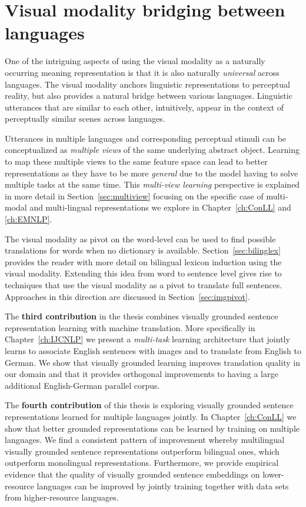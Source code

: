 \section{Visual modality bridging between languages}

One of the intriguing aspects of using the visual modality as a naturally occurring
meaning representation is that it is also naturally \emph{universal} across languages.
The visual modality anchors linguistic representations to perceptual reality, but also
provides a natural bridge between various languages. Linguistic utterances that are similar
to each other, intuitively, appear in the context of perceptually similar scenes across languages.

Utterances in multiple languages and corresponding perceptual stimuli
can be conceptualized as \emph{multiple views} of the same underlying abstract object.
Learning to map these multiple views to the same feature space can lead to better representations as
they have to be more \emph{general} due to the model having to solve multiple tasks at the same time.
This \emph{multi-view learning} perspective is explained in more detail in Section~\ref{sec:multiview}
focusing on the specific case of multi-modal and multi-lingual representations we explore in
Chapter~\ref{ch:ConLL} and \ref{ch:EMNLP}.

The visual modality as pivot on the word-level can be used to find possible translations
for words when no dictionary is available. Section~\ref{sec:bilinglex} provides the reader with more
detail on bilingual lexicon induction using the visual modality.
Extending this idea from word to sentence level gives rise to techniques that
use the visual modality as a pivot to translate full sentences. Approaches in this direction are discussed
in Section~\ref{sec:imgpivot}.

The \textbf{third contribution} in the thesis combines visually grounded sentence representation learning
with machine translation. More specifically in Chapter~\ref{ch:IJCNLP} we present a \emph{multi-task}
learning architecture that jointly learns to associate English sentences with images and to translate from
English to German. We show that visually grounded learning improves translation quality in our domain and that
it provides orthogonal improvements to having a large additional English-German parallel corpus.

The \textbf{fourth contribution} of this thesis is exploring visually grounded 
sentence representations learned for multiple languages jointly.  
In Chapter~\ref{ch:ConLL} we show that better grounded
representations can be learned by training on multiple languages. We find a consistent pattern
of improvement whereby multilingual visually grounded sentence representations 
outperform bilingual ones, which outperform monolingual representations. 
Furthermore, we provide empirical evidence that the quality of
visually grounded sentence embeddings on lower-resource languages can be improved by jointly training
together with data sets from higher-resource languages.

